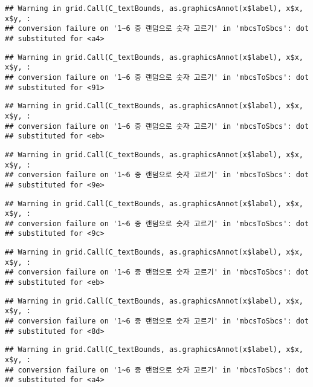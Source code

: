 \documentclass[]{book}
\begin{document}
\begin{verbatim}
## Warning in grid.Call(C_textBounds, as.graphicsAnnot(x$label), x$x, x$y, :
## conversion failure on '1~6 중 랜덤으로 숫자 고르기' in 'mbcsToSbcs': dot
## substituted for <a4>
\end{verbatim}

\begin{verbatim}
## Warning in grid.Call(C_textBounds, as.graphicsAnnot(x$label), x$x, x$y, :
## conversion failure on '1~6 중 랜덤으로 숫자 고르기' in 'mbcsToSbcs': dot
## substituted for <91>
\end{verbatim}

\begin{verbatim}
## Warning in grid.Call(C_textBounds, as.graphicsAnnot(x$label), x$x, x$y, :
## conversion failure on '1~6 중 랜덤으로 숫자 고르기' in 'mbcsToSbcs': dot
## substituted for <eb>
\end{verbatim}

\begin{verbatim}
## Warning in grid.Call(C_textBounds, as.graphicsAnnot(x$label), x$x, x$y, :
## conversion failure on '1~6 중 랜덤으로 숫자 고르기' in 'mbcsToSbcs': dot
## substituted for <9e>
\end{verbatim}

\begin{verbatim}
## Warning in grid.Call(C_textBounds, as.graphicsAnnot(x$label), x$x, x$y, :
## conversion failure on '1~6 중 랜덤으로 숫자 고르기' in 'mbcsToSbcs': dot
## substituted for <9c>
\end{verbatim}

\begin{verbatim}
## Warning in grid.Call(C_textBounds, as.graphicsAnnot(x$label), x$x, x$y, :
## conversion failure on '1~6 중 랜덤으로 숫자 고르기' in 'mbcsToSbcs': dot
## substituted for <eb>
\end{verbatim}

\begin{verbatim}
## Warning in grid.Call(C_textBounds, as.graphicsAnnot(x$label), x$x, x$y, :
## conversion failure on '1~6 중 랜덤으로 숫자 고르기' in 'mbcsToSbcs': dot
## substituted for <8d>
\end{verbatim}

\begin{verbatim}
## Warning in grid.Call(C_textBounds, as.graphicsAnnot(x$label), x$x, x$y, :
## conversion failure on '1~6 중 랜덤으로 숫자 고르기' in 'mbcsToSbcs': dot
## substituted for <a4>
\end{verbatim}
\end{document}
